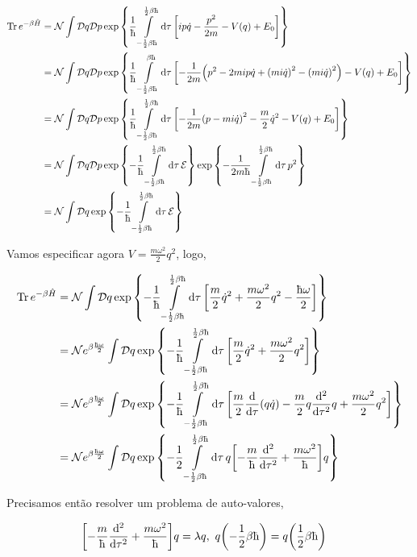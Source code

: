 \documentclass[twoside]{amsart}
\newcommand{\Dd}[1]{\mathcal D #1}
\numberwithin{equation}{section}
\begin{document}
\begin{align}
    \Tr e^{-\beta\hat H}&=\mathcal N\int\Dd{q}\Dd{p}\exp\qty{\frac1\hbar\int\limits_{-\frac12\beta\hbar}^{\frac12\beta\hbar}\dd{\tau}\qty[ip\dot q-\frac{p^2}{2m}-V\qty(q)+E_0]}\\
    &=\mathcal N\int\Dd{q}\Dd{p}\exp\qty{\frac1\hbar\int\limits_{-\frac12\beta\hbar}^{\beta \hbar}\dd{\tau}\qty[-\frac{1}{2m}\qty(p^2-2mip\dot q+\qty(mi\dot q)^2-\qty(mi\dot q)^2)-V\qty(q)+E_0]}\\
    &=\mathcal N\int\Dd{q}\Dd{p}\exp\qty{\frac1\hbar\int\limits_{-\frac12\beta\hbar}^{\frac12\beta\hbar}\dd{\tau}\qty[-\frac{1}{2m}\qty(p-mi\dot q)^2-\frac m2{\dot q}^2-V\qty(q)+E_0]}\\
    &=\mathcal N\int\Dd{q}\Dd{p}\exp\qty{-\frac1\hbar\int\limits_{-\frac12\beta\hbar}^{\frac12\beta\hbar}\dd{\tau}\mathcal E}\exp\qty{-\frac{1}{2m\hbar}\int\limits_{-\frac12\beta\hbar}^{\frac12\beta\hbar}\dd{\tau}p^2}\\
    &=\mathcal N\int\Dd{q}\exp\qty{-\frac1\hbar\int\limits_{-\frac12\beta\hbar}^{\frac12\beta\hbar}\dd{\tau}\mathcal E}
\end{align}

Vamos especificar agora $V=\frac{m\omega^2}{2}q^2$, logo,

\begin{align}
    \Tr e^{-\beta\hat H}&=\mathcal N\int\Dd{q}\exp\qty{-\frac1\hbar\int\limits_{-\frac12\beta\hbar}^{\frac12\beta\hbar}\dd{\tau}\qty[\frac m2{\dot q}^2+\frac{m\omega^2}{2}q^2-\frac{\hbar \omega}{2}]}\\
    &=\mathcal Ne^{\beta\frac{\hbar \omega}{2}}\int\Dd{q}\exp\qty{-\frac1\hbar\int\limits_{-\frac12\beta\hbar}^{\frac12\beta\hbar}\dd{\tau}\qty[\frac m2{\dot q}^2+\frac{m\omega^2}{2}q^2]}\\
    &=\mathcal Ne^{\beta\frac{\hbar \omega}{2}}\int\Dd{q}\exp\qty{-\frac1\hbar\int\limits_{-\frac12\beta\hbar}^{\frac12\beta\hbar}\dd{\tau}\qty[\frac m2\dv{}{\tau}\qty(q\dot q)-\frac m2q\dv[2]{}{\tau}q+\frac{m\omega^2}{2}q^2]}\\
    &=\mathcal Ne^{\beta\frac{\hbar \omega}{2}}\int\Dd{q}\exp\qty{-\frac12\int\limits_{-\frac12\beta\hbar}^{\frac12\beta\hbar}\dd{\tau}q\qty[-\frac m\hbar \dv[2]{}{\tau}+\frac{m\omega^2}{\hbar}]q}
\end{align}

Precisamos então resolver um problema de auto-valores,

\begin{align}
    \qty[-\frac m\hbar \dv[2]{}{\tau}+\frac{m\omega^2}{\hbar}]q&=\lambda q,\ q\qty(-\frac12\beta\hbar)=q\qty(\frac12\beta\hbar)
\end{align}
\end{document}

